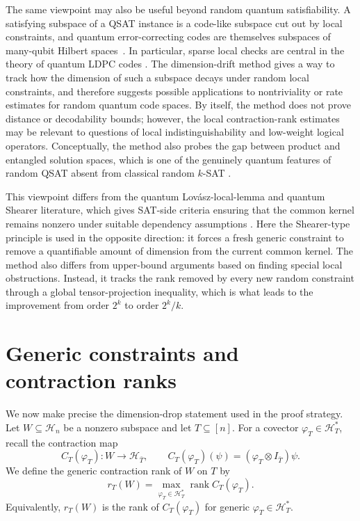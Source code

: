 \documentclass[11pt]{article}
\DeclareMathOperator{\rank}{rank}
\begin{document}
The same viewpoint may also be useful beyond random quantum satisfiability.
A satisfying subspace of a QSAT instance is a code-like subspace cut out by
local constraints, and quantum error-correcting codes are themselves subspaces
of many-qubit Hilbert spaces~\cite{KnillLaflamme97}.  In particular, sparse
local checks are central in the theory of quantum LDPC codes
\cite{TillichZemor14,PanteleevKalachev22}.  The dimension-drift method gives a
way to track how the dimension of such a subspace decays under random local
constraints, and therefore suggests possible applications to nontriviality or
rate estimates for random quantum code spaces.  By itself, the method does not
prove distance or decodability bounds; however, the local contraction-rank
estimates may be relevant to questions of local indistinguishability and
low-weight logical operators.  Conceptually, the method also probes the gap
between product and entangled solution spaces, which is one of the genuinely
quantum features of random QSAT absent from classical random \(k\)-SAT
\cite{LLMSS10,LMRV24}.

This viewpoint differs from the quantum Lov\'asz-local-lemma and quantum
Shearer literature, which gives SAT-side criteria ensuring that the common
kernel remains nonzero under suitable dependency assumptions
\cite{AKS,SMLM16,HLSZ19}.  Here the Shearer-type principle is used in the
opposite direction: it forces a fresh generic constraint to remove a
quantifiable amount of dimension from the current common kernel.  The method
also differs from upper-bound arguments based on finding special local
obstructions.  Instead, it tracks the rank removed by every new random
constraint through a global tensor-projection inequality, which is what leads
to the improvement from order \(2^k\) to order \(2^k/k\).


\section{Generic constraints and contraction ranks}
\label{sec:contraction-ranks}

We now make precise the dimension-drop statement used in the proof strategy.
Let \(W\subseteq\mathcal H_n\) be a nonzero subspace and let \(T\subseteq[n]\).
For a covector \(\varphi_T\in\mathcal H_T^*\), recall the contraction map
\[
C_T(\varphi_T):W\to\mathcal H_{\bar T},
\qquad
C_T(\varphi_T)(\psi)
=
(\varphi_T\otimes I_{\bar T})\psi .
\]
We define the generic contraction rank of \(W\) on \(T\) by
\[
r_T(W)
=
\max_{\varphi_T\in\mathcal H_T^*}
\rank C_T(\varphi_T).
\]
Equivalently, \(r_T(W)\) is the rank of \(C_T(\varphi_T)\) for generic
\(\varphi_T\in\mathcal H_T^*\).
\end{document}
